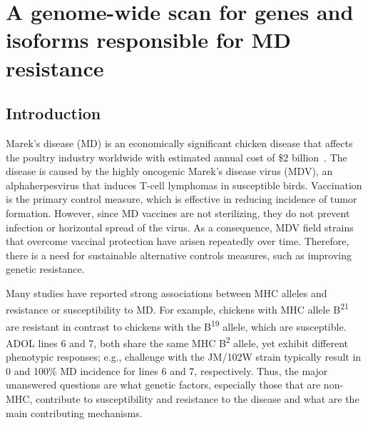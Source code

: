 \chapter{A genome-wide scan for genes and isoforms responsible
for MD resistance}
\section{Introduction}

Marek's disease (MD) is an economically significant chicken
disease that affects the poultry industry worldwide with
estimated annual cost of \$2 billion~\cite{morrow2004marek}.  The
disease is caused by the highly oncogenic Marek's disease virus
(MDV), an alphaherpesvirus that induces T-cell lymphomas in
susceptible birds.  Vaccination is the primary control measure,
which is effective in reducing incidence of tumor formation.
However, since MD vaccines are not sterilizing, they do not
prevent infection or horizontal spread of the virus.  As a
consequence, MDV field strains that overcome vaccinal protection
have arisen repeatedly over time.  Therefore, there is a need for
sustainable alternative controls measures, such as improving
genetic resistance.

Many studies have reported strong associations between MHC alleles and
resistance or susceptibility to MD.  For example, chickens with MHC
allele B\textsuperscript{21} are resistant in contrast to chickens
with the B\textsuperscript{19} allele, which are susceptible.  ADOL
lines 6 and 7, both share the same MHC B\textsuperscript{2} allele,
yet exhibit different phenotypic responses; e.g., challenge with the
JM/102W strain typically result in 0 and 100\% MD incidence for lines
6 and 7, respectively.  Thus, the major unanswered questions are what
genetic factors, especially those that are non-MHC, contribute to
susceptibility and resistance to the disease and what are the main
contributing mechanisms.

